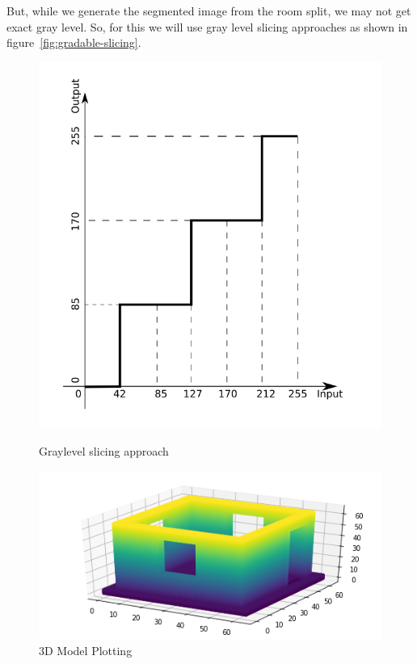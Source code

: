             \break
            But, while we generate the segmented image from the room split, we may not get exact gray level. So, for this we will use gray level slicing approaches as shown in figure~\ref{fig:gradable-slicing}.\\
            \begin{figure}[h]
                \centering
                \begin{minipage}{.45\textwidth}
                    \centering                 
                    \includegraphics[width=1\textwidth]{img/experiment/3d_generation/gradable-slicing.png}                 
                    \caption{Graylevel slicing approach}                 
                    \label{fig:gradable-slicing}
                \end{minipage}%
                \hfill
                \begin{minipage}{.45\textwidth}
                    \centering                 
                    \includegraphics[width=1\textwidth]{img/experiment/3d_generation/3d-image.png}                 
                    \caption{3D Model Plotting}                 
                    \label{fig:3d-model} 
                \end{minipage}
            \end{figure}
